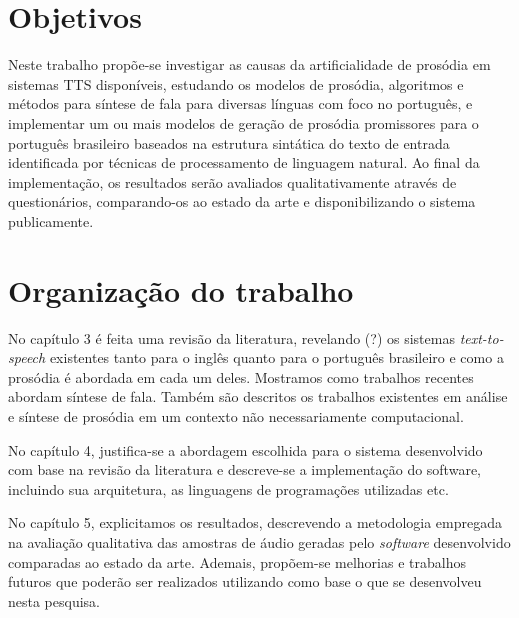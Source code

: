 \section{Objetivos}
Neste trabalho propõe-se investigar as causas da artificialidade de prosódia em sistemas TTS disponíveis, estudando os modelos de prosódia, algoritmos e métodos para síntese de fala para diversas línguas com foco no português, e implementar um ou mais modelos de geração de prosódia promissores para o português brasileiro baseados na estrutura sintática do texto de entrada identificada por técnicas de processamento de linguagem natural. Ao final da implementação, os resultados serão avaliados qualitativamente através de questionários, comparando-os ao estado da arte e disponibilizando o sistema publicamente.

\section{Organização do trabalho}


No capítulo 3 é feita uma revisão da literatura, revelando (?) os sistemas
\emph{text-to-speech} existentes tanto para o inglês quanto para o português
brasileiro e como a prosódia é abordada em cada um deles. Mostramos como
trabalhos recentes abordam síntese de fala. Também são descritos
os trabalhos existentes em análise e síntese de prosódia em um contexto não
necessariamente computacional.

No capítulo 4, justifica-se a abordagem escolhida para o sistema desenvolvido
com base na revisão da literatura e descreve-se a implementação do software,
incluindo sua arquitetura, as linguagens de programações utilizadas etc.

No capítulo 5, explicitamos os resultados, descrevendo a metodologia empregada
na avaliação qualitativa das amostras de áudio geradas pelo \emph{software}
desenvolvido comparadas ao estado da arte. Ademais, propõem-se melhorias e
trabalhos futuros que poderão ser realizados utilizando como base o que se
desenvolveu nesta pesquisa.